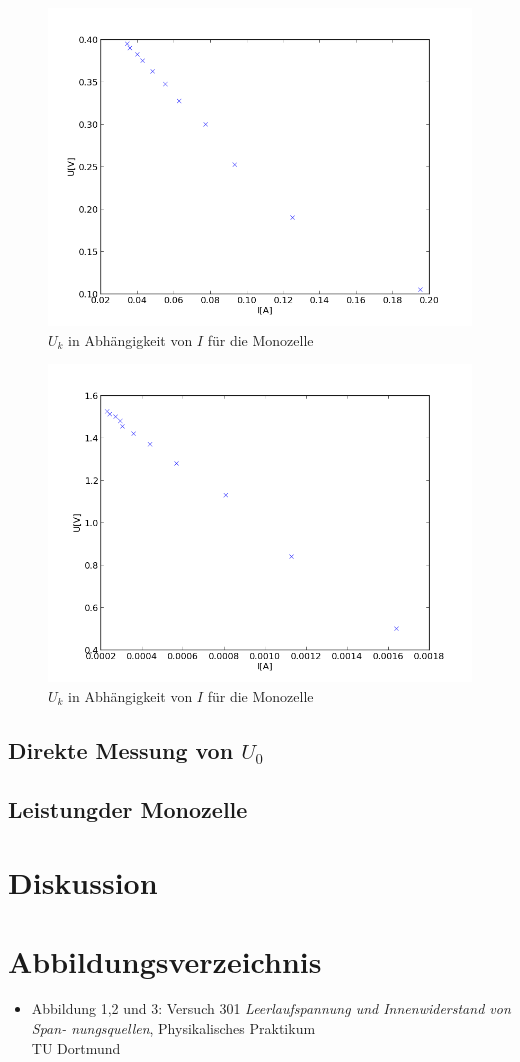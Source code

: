 \documentclass[11pt]{article}
\begin{document}
\begin{figure}
\centering
\includegraphics[scale=1.00]{Plot2.png}
\caption{$U_k$ in Abh\"angigkeit von $I$ f\"ur die Monozelle}
\label{Plot2}
\end{figure}
\begin{figure}
\centering
\includegraphics[scale=1.00]{Plot3.png}
\caption{$U_k$ in Abh\"angigkeit von $I$ f\"ur die Monozelle}
\label{Plot3}
\end{figure}
\subsection{Direkte Messung von $U_0$}
\subsection{Leistungder Monozelle}
\section{Diskussion}
\section{Abbildungsverzeichnis}
\begin{itemize}
\item Abbildung 1,2 und 3: Versuch 301 \textit{Leerlaufspannung und Innenwiderstand von Span-
nungsquellen}, Physikalisches Praktikum\\ TU Dortmund
\end{itemize}
\end{document}
